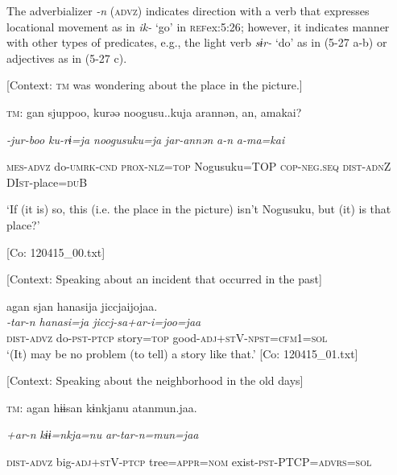 The adverbializer \textit{{}-n} (\textsc{advz}) indicates direction with a verb that expresses locational movement as in \textit{ik-} ‘go’ in \textsc{ref}{ex:5:26}; however, it indicates manner with other types of predicates, e.g., the light verb \textit{sɨr-} ‘do’ as in (5-27 a-b) or adjectives as in (5-27 c).

\ea \label{ex:5:27}  \ea \label{ex:5:27a} [Context: \textsc{tm} was wondering about the place in the picture.]

    \textsc{tm}:  gan  sjuppoo,  kurəə  noogusu..kuja   arannən,  an,  amakai?

      \textit{}  \textit{-jur-boo  ku-rɨ=ja  noogusuku=ja} \textit{jar-annən}  \textit{a-n}  \textit{a-ma=kai}
                                                                    
      \textsc{mes}-\textsc{advz}  do-\textsc{umrk}-\textsc{cnd}  \textsc{prox}-\textsc{nlz}=\textsc{top}  Nogusuku=TOP  \textsc{cop}-\textsc{neg}.\textsc{seq}  \textsc{dist}-\textsc{adn}Z  DI\textsc{st}-place=\textsc{du}B

      ‘If (it is) so, this (i.e. the place in the picture) isn’t Nogusuku, but (it) is that place?’

      [Co: 120415\_00.txt]

 \ex \label{ex:5:b} [Context: Speaking about an incident that occurred in the past]

\glll  agan  sjan  hanasija  jiccjaijojaa.\\
\textit{}  \textit{-tar-n  hanasi=ja  jiccj-sa+ar-i=joo=jaa}\\
\textsc{dist}-\textsc{advz}  do-\textsc{pst}-\textsc{ptcp}  story=\textsc{top}  good-\textsc{adj}+\textsc{st}V-\textsc{npst}=\textsc{cfm}1=\textsc{sol}\\
\glt ‘(It) may be no problem (to tell) a story like that.’ [Co: 120415\_01.txt]

 \ex \label{ex:5:c} [Context: Speaking about the neighborhood in the old days]

    \textsc{tm}:  agan  hɨɨsan  kɨnkjanu   atanmun.jaa.

      \textit{}  \textit{+ar-n}  \textit{kɨɨ=nkja=nu}   \textit{ar-tar-n=mun=jaa}
                                                                  
      \textsc{dist}-\textsc{advz}  big-\textsc{adj}+\textsc{st}V-\textsc{ptcp}  tree=\textsc{appr}=\textsc{nom} exist-\textsc{pst}-PTCP=\textsc{advrs}=\textsc{sol}


